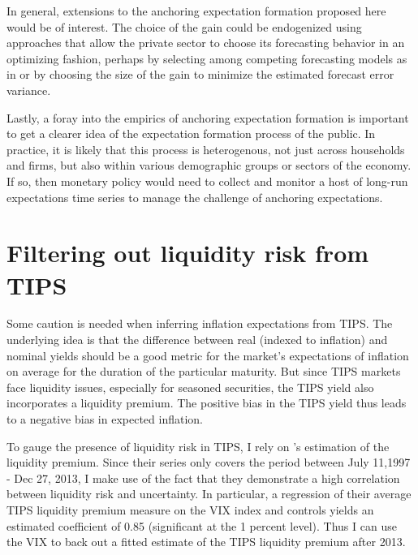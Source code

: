 \documentclass[11pt]{article}
\def \myBibPath {../../literature/}
\renewcommand{\[}{\begin{equation}}
\renewcommand{\]}{\end{equation}}
\begin{document}
In general, extensions to the anchoring expectation formation proposed here would be of interest. The choice of the gain could be endogenized using approaches that allow the private sector to choose its forecasting behavior in an optimizing fashion, perhaps by selecting among competing forecasting models as in \cite{Branch2011} or by choosing the size of the gain to minimize the estimated forecast error variance. 

Lastly, a foray into the empirics of anchoring expectation formation is important to get a clearer idea of the expectation formation process of the public. In practice, it is likely that this process is heterogenous, not just across households and firms, but also within various demographic groups or sectors of the economy. If so, then monetary policy would need to collect and monitor a host of long-run expectations time series to manage the challenge of anchoring expectations. 



\clearpage
\newpage



\newpage
\appendix


\section{Filtering out liquidity risk from TIPS}\label{TIPS} 
Some caution is needed when inferring inflation expectations from TIPS. The underlying idea is that the difference between real (indexed to inflation) and nominal yields should be a good metric for the market's expectations of inflation on average for the duration of the particular maturity. But since TIPS markets face liquidity issues, especially for seasoned securities, the TIPS yield also incorporates a liquidity premium. The positive bias in the TIPS yield thus leads to a negative bias in expected inflation.

To gauge the presence of liquidity risk in TIPS, I rely on \cite{andreasen2018tips}'s estimation of the liquidity premium. Since their series only covers the period between July 11,1997 - Dec 27, 2013, I make use of the fact that they demonstrate a high correlation between liquidity risk and uncertainty. In particular, a regression of their average TIPS liquidity premium measure on the VIX index and controls yields an estimated coefficient of 0.85 (significant at the 1 percent level). Thus I can use the VIX to back out a fitted \cite{andreasen2018tips} estimate of the TIPS liquidity premium after 2013. 
\end{document}
